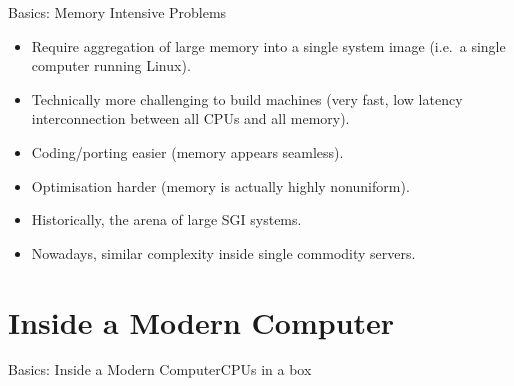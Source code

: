\begin{frame}{Basics: Memory Intensive Problems}
\begin{itemize}
\item{Require aggregation of large memory into a \alert{single system image} (i.e.\ a single computer running Linux).}
\pause
\item{Technically more challenging to build machines (very fast, low latency interconnection between \alert{all} CPUs and \alert{all} memory).}
\pause
\item{Coding/porting easier (memory appears seamless).}
\pause
\item{Optimisation harder (memory is actually highly nonuniform).}
\pause
\item{Historically, the arena of large \alert{SGI} systems.}
\pause
\item{Nowadays, similar complexity inside single commodity servers.}
\end{itemize}
\end{frame}


\section{Inside a Modern Computer}
\begin{frame}{Basics: Inside a Modern Computer}{CPUs in a box}
%
\end{frame}

